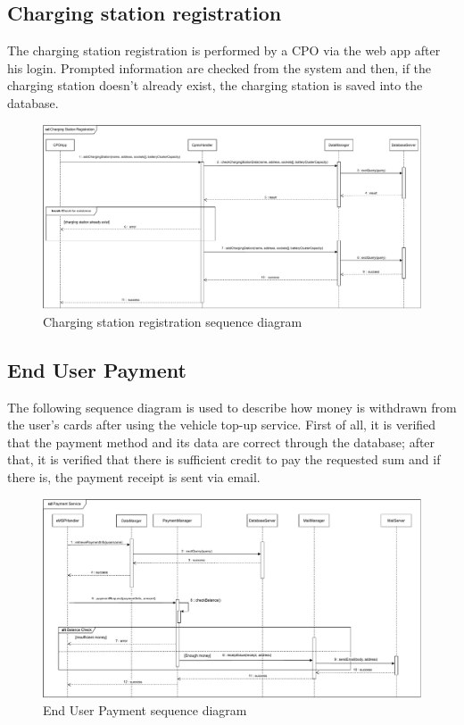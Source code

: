 \subsection{Charging station registration}
The charging station registration is performed by a CPO via the web app after his login. Prompted
information are checked from the system and then, if the charging station doesn’t already exist, the
charging station is saved into the database.
\begin{figure}[H]
    \centering
    \includegraphics[width=\textwidth]{images/sd_chargingStationRegistration.pdf}
    \caption{Charging station registration sequence diagram}
    \label{fig:chargingStationRegistration}
\end{figure}
\subsection{End User Payment}
The following sequence diagram is used to describe how money is withdrawn from the user's cards after using the vehicle top-up service. First of all, it is verified that the payment method and its data are correct through the database; after that, it is verified that there is sufficient credit to pay the requested sum and if there is, the payment receipt is sent via email.
\begin{figure}[H]
    \centering
    \includegraphics[width=\textwidth]{images/sd_paymentMethod.pdf}
    \caption{End User Payment sequence diagram}
    \label{fig:endUserPayment}
\end{figure}
